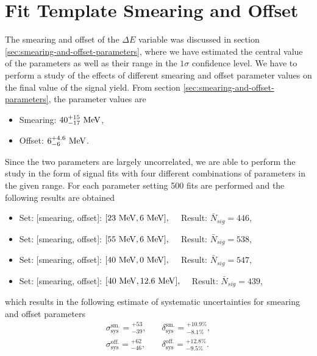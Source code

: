 \section{Fit Template Smearing and Offset}
The smearing and offset of the $\Delta E$ variable was discussed in section \ref{sec:smearing-and-offset-parameters}, where we have estimated the central value of the parameters as well as their range in the $1\sigma$ confidence level. We have to perform a study of the effects of different smearing and offset parameter values on the final value of the signal yield. From section \ref{sec:smearing-and-offset-parameters}, the parameter values are
\begin{itemize}
	\item Smearing: $40_{-17}^{+15}\mathrm{~MeV}$,
	\item Offset: $6_{-6}^{+4.6}\mathrm{~MeV}$.
\end{itemize}
Since the two parameters are largely uncorrelated, we are able to perform the study in the form of signal fits with four different combinations of parameters in the given range. For each parameter setting 500 fits are performed and the following results are obtained
\begin{itemize}
	\item Set: [smearing, offset]: $[23\mathrm{~MeV},6\mathrm{~MeV}],\quad$ Result: $ \bar N {}_{sig} = 446 $,
	\item Set: [smearing, offset]: $[55\mathrm{~MeV},6\mathrm{~MeV}],\quad$ Result: $ \bar N {}_{sig} = 538 $,
	\item Set: [smearing, offset]: $[40\mathrm{~MeV},0\mathrm{~MeV}],\quad$ Result: $ \bar N {}_{sig} = 547 $,
	\item Set: [smearing, offset]: $[40\mathrm{~MeV},12.6\mathrm{~MeV}],\quad$ Result: $ \bar N {}_{sig} = 439 $,
\end{itemize}
which results in the following estimate of systematic uncertainties for smearing and offset parameters
\begin{align}
\sigma_{\mathrm{sys}}^{\mathrm{sm.}} = {}^{+53}_{-39},&\quad \delta_{\mathrm{sys}}^{\mathrm{sm.}} = {}^{+10.9\%}_{-8.1\%}, \\
\sigma_{\mathrm{sys}}^{\mathrm{off.}} = {}^{+62}_{-46},&\quad \delta_{\mathrm{sys}}^{\mathrm{off.}} = {}^{+12.8\%}_{-9.5\%}.
\end{align}


